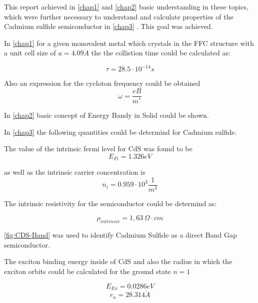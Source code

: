 This report achieved in \ref{chap1}  and \ref{chap2} 
basic understanding in these topics, which were further necessary to 
understand and calculate properties of the Cadmium sulfide semiconductor in
\ref{chap3} . This goal was achieved.

In \ref{chap1}  for a given monovalent metal which crystals in the FFC structure
with a unit cell size of  $a = 4.09 \mathring{A}$ the the collistion
time could be calculated as:

$$\tau = 28.5 \cdot 10^{-14}s$$

Also an expression for the cycloton frequency could be obtained
$$\omega = \frac{eB}{m^*}$$

In \ref{chap2}  basic concept of Energy Bandy in
Solid could be shown.


In \ref{chap3}  the following quantities could 
be determind for Cadmium sulfide.

The value of the intrinsic fermi level for CdS was found to be
$$E_{Fi} = 1.326 eV$$

as well as the intrinsic carrier concentration is
$$n_i = 0.959 \cdot 10^3 \frac{1}{m^3}$$

The intrinsic resistivity for the semiconductor could be determind 
as:

$$\rho_{intrinsic} =  1,63 \, \Omega \cdot cm$$

\autoref{fig:CDS-Band} was used to identify Cadmium Sulfide
as a direct Band Gap semiconductor.

The exciton binding energy inside of CdS and also the radius in 
which the exciton orbits could be calculated for the ground state
$n=1$

$$E_{Ex} = 0.0286 eV$$
$$r_n = 28.314 \mathring{A}$$